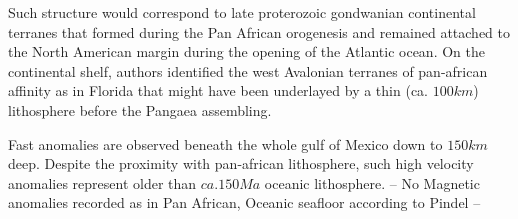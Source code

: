 \documentclass[12pt]{article}
\begin{document}
		Such structure would correspond to late proterozoic gondwanian continental terranes that formed during the Pan African orogenesis \citep{kennedy1964structural} and remained attached to the North American margin during the opening of the Atlantic ocean. \citep[e.g.][]{thomas2006tectonic}
		On the continental shelf, authors \citep[e.g.][]{o1983avalon,nance2002cordilleran} identified the west Avalonian terranes of pan-african affinity as in Florida \citep[see][]{smith1982review} that might have been underlayed by a thin (ca. $100km$) lithosphere before the Pangaea assembling. \citep{mckenzie2015lithospheric}

		Fast anomalies are observed beneath the whole gulf of Mexico down to $150km$ deep. Despite the proximity with pan-african lithosphere, such high velocity anomalies represent older than $ca. 150Ma$ oceanic lithosphere. \citep{muller2008age,pindell2009tectonic}
		-- No Magnetic anomalies recorded as in Pan African, Oceanic seafloor according to Pindel --




\end{document}
